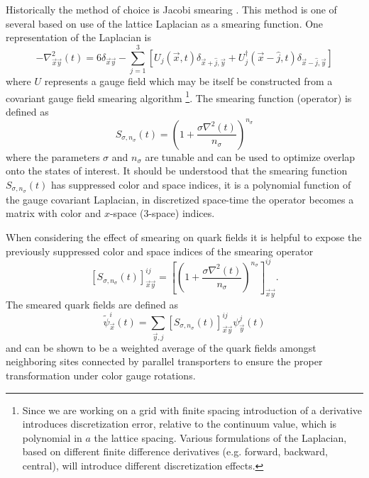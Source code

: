 Historically the method of choice is Jacobi smearing \cite{Allton:1993wc}. This method is one of several based on use of the lattice Laplacian as a smearing function. One representation   of the Laplacian is
\begin{equation*}
-\nabla^2_{\vec{x}\vec{y}}(t) = 6 \delta_{\vec{x}\vec{y}} - \sum_{j=1}^3 \left[ U_j(\vec{x},t)\delta_{\vec{x}+\hat{j},\vec{y}} + U^\dagger_j(\vec{x}-\hat{j},t)\delta_{\vec{x}-\hat{j},\vec{y}}\right]
\end{equation*}
where $U$ represents a gauge field which may be itself be constructed from a covariant gauge field smearing algorithm \footnote{Since we are working on a grid with finite spacing introduction of a derivative introduces discretization error, relative to the continuum value, which is polynomial in $a$ the lattice spacing. Various formulations of the Laplacian, based on different finite difference derivatives (e.g. forward, backward, central), will introduce different discretization effects. }. The smearing function (operator) is defined as 
\begin{equation*}
S_{\sigma,n_\sigma}(t) = \left( 1 + \frac{\sigma \nabla^2(t)}{n_\sigma}\right)^{n_\sigma} 
\end{equation*}
where the parameters $\sigma$ and $n_\sigma$ are tunable and can be used to optimize overlap onto the states of interest. It should be understood that the smearing function $S_{\sigma,n_\sigma}(t)$ has suppressed color and space indices, it is a polynomial function of the gauge covariant Laplacian, in discretized space-time the operator becomes a matrix with color and $x$-space (3-space) indices. 

When considering the effect of smearing on quark fields it is helpful  to expose the previously suppressed color and space indices of the smearing operator
\begin{equation*}
\left[S_{\sigma,n_\sigma}(t)\right]_{\vec{x}\vec{y}}^{ij} = \left[ \left( 1 + \frac{\sigma \nabla^2(t)}{n_\sigma}\right)^{n_\sigma} \right]_{\vec{x}\vec{y}}^{ij}.
\end{equation*}
The smeared quark fields are defined as 
\begin{equation*}
\tilde{\psi}_{\vec{x}}^i(t) = \sum_{\vec{y},j} \left[S_{\sigma,n_\sigma}(t)\right]_{\vec{x}\vec{y}}^{ij} \psi_{\vec{y}}^j(t)
\end{equation*}
and can be shown to be a weighted average of the quark fields amongst neighboring sites connected by parallel transporters to ensure the proper transformation under color gauge rotations.

